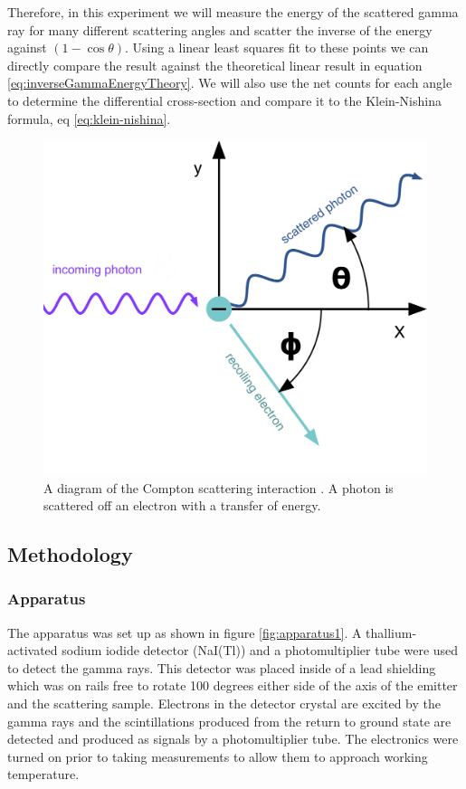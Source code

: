 \documentclass[%
reprint,
amsmath,amssymb,
aps,
floatfix
]{revtex4-2}
\begin{document}
			Therefore, in this experiment we will measure the energy of the scattered gamma ray for many different scattering angles and scatter the inverse of the energy against $(1-\cos\theta)$. Using a linear least squares fit to these points we can directly compare the result against the theoretical linear result in equation \ref{eq:inverseGammaEnergyTheory}. We will also use the net counts for each angle to determine the differential cross-section and compare it to the Klein-Nishina formula, eq \ref{eq:klein-nishina}.

			\begin{figure}
				\includegraphics[width=0.7\columnwidth]{compton_scattering.png}
				\caption{\label{fig:diagram}A diagram of the Compton scattering interaction \cite{comptonFIU}. A photon is scattered off an electron with a transfer of energy.}
			\end{figure}
		
		\subsection{Methodology}
					
			\subsubsection{Apparatus}			
			
			The apparatus was set up as shown in figure \ref{fig:apparatus1}. A thallium-activated sodium iodide detector (NaI(Tl)) and a photomultiplier tube were used to detect the gamma rays. This detector was placed inside of a lead shielding which was on rails free to rotate 100 degrees either side of the axis of the emitter and the scattering sample. Electrons in the detector crystal are excited by the gamma rays and the scintillations produced from the return to ground state are detected and produced as signals by a photomultiplier tube. The electronics were turned on prior to taking measurements to allow them to approach working temperature.\\
			
\end{document}
